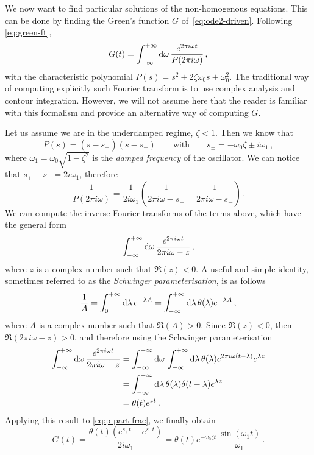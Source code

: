 We now want to find particular solutions of the non-homogenous equations. This can be done
by finding the Green's function $G$ of~\cref{eq:ode2-driven}. Following
\cref{eq:green-ft},
\begin{equation}
  G(t)=\int_{-\infty}^{+\infty}\mathrm{d}{\omega}\,\frac{e^{2\pi i\omega t}}{P(2\pi i\omega)}\,,
\end{equation}
with the characteristic polynomial $P(s)=s^2+2\zeta\omega_0s+\omega_0^2$. The traditional
way of computing explicitly such Fourier transform is to use complex analysis and contour
integration. However, we will not assume here that the reader is familiar with this
formalism and provide an alternative way of computing $G$.

Let us assume we are in the underdamped regime, \ie $\zeta<1$. Then we know that
\begin{equation}
  P(s)=(s-s_+)(s-s_-)\qquad\text{with}\qquad
  s_\pm=-\omega_0\zeta\pm i\omega_1\,,
\end{equation}
where $\omega_1=\omega_0\sqrt{1-\zeta^2}$ is the \emph{damped frequency} of the
oscillator. We can notice that $s_+-s_-=2i\omega_1$, therefore
\begin{equation}
  \frac{1}{P(2\pi i\omega)}=\frac{1}{2i\omega_1}\left(\frac{1}{2\pi i\omega-s_+}
  -\frac{1}{2\pi i\omega-s_-}\right)\,.
  \label{eq:p-part-frac}
\end{equation}
We can compute the inverse Fourier transforms of the terms above, which have the general
form
\begin{equation}
  \int_{-\infty}^{+\infty}\mathrm{d}{\omega}\,\frac{e^{2\pi i\omega t}}{2\pi i \omega-z}\,,
\end{equation}
where $z$ is a complex number such that $\Re(z)<0$. A useful and simple identity,
sometimes referred to as the \emph{Schwinger parameterisation}, is as follows
\begin{equation}
  \frac{1}{A}=\int_0^{+\infty}\mathrm{d}\lambda\,e^{-\lambda A}
  =\int_{-\infty}^{+\infty}\mathrm{d}{\lambda}\,\theta(\lambda)e^{-\lambda A}\,,
\end{equation}
where $A$ is a complex number such that $\Re(A)>0$. Since $\Re(z)<0$, then $\Re(2\pi i
\omega-z)>0$, and therefore using the Schwinger parameterisation
\begin{align}
  \int_{-\infty}^{+\infty}\mathrm{d}{\omega}\,\frac{e^{2\pi i\omega t}}{2\pi i \omega-z}&=
  \int_{-\infty}^{+\infty}\mathrm{d}{\omega}\,\int_{-\infty}^{+\infty}\mathrm{d}{\lambda}\,\theta(\lambda)
  e^{2\pi i\omega(t-\lambda)}e^{\lambda z}\notag\\
  &=\int_{-\infty}^{+\infty}\mathrm{d}{\lambda}\,\theta(\lambda)\delta(t-\lambda)e^{\lambda z}\notag\\
  &=\theta(t)e^{zt}\,.
\end{align}
Applying this result to \cref{eq:p-part-frac}, we finally obtain
\begin{equation}
  G(t)=\frac{\theta(t)(e^{s_+t}-e^{s_-t})}{2i\omega_1}
  =\theta(t)e^{-\omega_0\zeta t}\,\frac{\sin(\omega_1t)}{\omega_1}\,.
  \label{eq:green-underdamped}
\end{equation}
